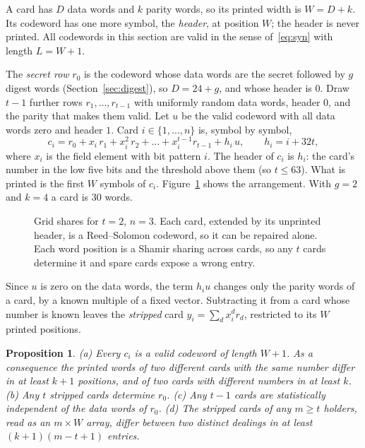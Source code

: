 \documentclass[numeric]{anvil-paper}
\newtheorem{proposition}{Proposition}
\begin{document}
A card has $D$ data words and $k$ parity words, so its printed width is
$W=D+k$. Its codeword has one more symbol, the \emph{header}, at position $W$;
the header is never printed. All codewords in this section are valid in the
sense of~\eqref{eq:syn} with length $L=W+1$.

The \emph{secret row} $r_0$ is the codeword whose data words are the secret
followed by $g$ digest words (Section~\ref{sec:digest}), so $D=24+g$, and whose
header is $0$. Draw $t-1$ further rows $r_1,\dots,r_{t-1}$ with uniformly random
data words, header $0$, and the parity that makes them valid. Let $u$ be the
valid codeword with all data words zero and header $1$. Card $i\in\{1,\dots,n\}$
is, symbol by symbol,
\begin{equation}
c_i = r_0 + x_i\,r_1 + x_i^2\,r_2+\dots+x_i^{t-1}r_{t-1} + h_i\,u,
\qquad h_i = i+32t ,
\label{eq:card}
\end{equation}
where $x_i$ is the field element with bit pattern $i$. The header of $c_i$ is
$h_i$: the card's number in the low five bits and the threshold above them
(so $t\le 63$). What is printed is the first $W$ symbols of $c_i$.
Figure~\ref{fig:grid} shows the arrangement. With $g=2$ and $k=4$ a card is 30
words.

\begin{figure}[tb]
\centering

\caption{Grid shares for $t=2$, $n=3$. Each card, extended by its unprinted
header, is a Reed--Solomon codeword, so it can be repaired alone. Each word
position is a Shamir sharing across cards, so any $t$ cards determine it and
spare cards expose a wrong entry.}
\label{fig:grid}
\end{figure}

Since $u$ is zero on the data words, the term $h_i u$ changes only the parity
words of a card, by a known multiple of a fixed vector. Subtracting it from a
card whose number is known leaves the \emph{stripped} card
$y_i=\sum_d x_i^d r_d$, restricted to its $W$ printed positions.

\begin{proposition}
\label{prop:grid}
(a) Every $c_i$ is a valid codeword of length $W+1$. As a consequence the
printed words of two different cards with the same number differ in at least
$k+1$ positions, and of two cards with different numbers in at least $k$.
(b) Any $t$ stripped cards determine $r_0$.
(c) Any $t-1$ cards are statistically independent of the data words of $r_0$.
(d) The stripped cards of any $m\ge t$ holders, read as an $m\times W$ array,
differ between two distinct dealings in at least $(k+1)(m-t+1)$ entries.
\end{proposition}
\end{document}
